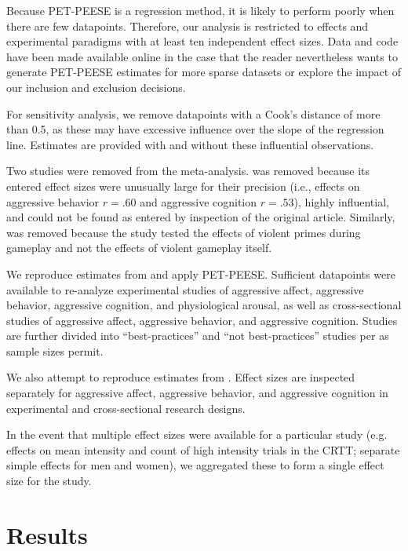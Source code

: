 \documentclass[man]{apa6}
\begin{document}
Because PET-PEESE is a regression method, it is likely to perform poorly when there are few datapoints. Therefore, our analysis is restricted to effects and experimental paradigms with at least ten independent effect sizes. %
Data and code have been made available online in the case that the reader nevertheless wants to generate PET-PEESE estimates for more sparse datasets or explore the impact of our inclusion and exclusion decisions.

For sensitivity analysis, we remove datapoints with a Cook's distance of more than 0.5, as these may have excessive influence over the slope of the regression line. Estimates are provided with and without these influential observations.

Two studies were removed from the meta-analysis. \citet[study 1]{Matsuzaki:etal:2006} was removed because its entered effect sizes were unusually large for their precision (i.e., effects on aggressive behavior $r = .60$ and aggressive cognition $r = .53$), highly influential, and could not be found as entered by inspection of the original article. Similarly, \citet{Panee:Ballard:2002} was removed because the study tested the effects of violent primes during gameplay and not the effects of violent gameplay itself. %

We reproduce estimates from \citet{Anderson:etal:2010} and apply PET-PEESE. Sufficient datapoints were available to re-analyze experimental studies of aggressive affect, aggressive behavior, aggressive cognition, and physiological arousal, as well as cross-sectional studies of aggressive affect, aggressive behavior, and aggressive cognition. Studies are further divided into ``best-practices'' and ``not best-practices'' studies per \citet{Anderson:etal:2010} as sample sizes permit. 

%
We also attempt to reproduce estimates from \citet{Greitemeyer:Mugge:2014}. Effect sizes are inspected separately for aggressive affect, aggressive behavior, and aggressive cognition in experimental and cross-sectional research designs.

In the event that multiple effect sizes were available for a particular study (e.g. effects on mean intensity and count of high intensity trials in the CRTT; separate simple effects for men and women), we aggregated these to form a single effect size for the study.

\section{Results}
\end{document}
